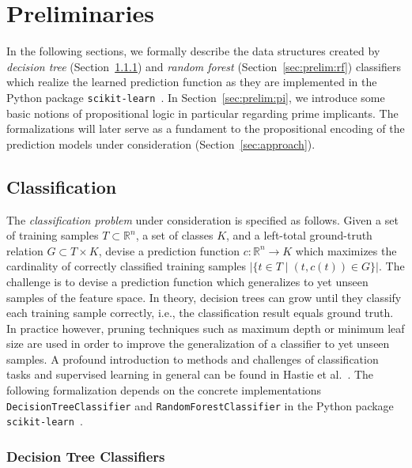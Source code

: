 \documentclass{easychair}
\theoremstyle{definition}
\begin{document}
\section{Preliminaries}
\label{sec:prelim}

In the following sections, we formally describe the data structures created by \emph{decision tree} (Section~\ref{sec:prelim:dt}) and \emph{random forest} (Section~\ref{sec:prelim:rf}) classifiers which realize the learned prediction function as they are implemented in the Python package \verb!scikit-learn!~\cite{Pedregosa:2011:Scikit}. 
In Section~\ref{sec:prelim:pi}, we introduce some basic notions of propositional logic in particular regarding prime implicants. 
The formalizations will later serve as a fundament to the propositional encoding of the prediction models under consideration (Section~\ref{sec:approach}). 

\subsection{Classification}
\label{sec:prelim:classification}

The \emph{classification problem} under consideration is specified as follows. 
Given a set of training samples $T \subset \mathbb{R}^n$, a set of classes $K$, and a left-total ground-truth relation $G \subset T \times K$, devise a prediction function $c : \mathbb{R}^n \rightarrow K$ which maximizes the cardinality of correctly classified training samples $\bigl|\{ t \in T \mid (t, c(t)) \in G \}\bigr|$. 
The challenge is to devise a prediction function which generalizes to yet unseen samples of the feature space. 
In theory, decision trees can grow until they classify each training sample correctly, i.e., the classification result equals ground truth. 
In practice however, pruning techniques such as maximum depth or minimum leaf size are used in order to improve the generalization of a classifier to yet unseen samples. 
A profound introduction to methods and challenges of classification tasks and supervised learning in general can be found in Hastie et al.~\cite{Hastie:2009}. 
The following formalization depends on the concrete implementations \verb!DecisionTreeClassifier! and \verb!RandomForestClassifier! in the Python package \verb!scikit-learn!~\cite{Pedregosa:2011:Scikit}.

\subsubsection{Decision Tree Classifiers}
\label{sec:prelim:dt}
\end{document}
